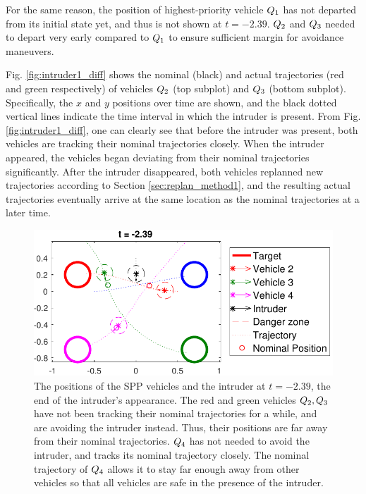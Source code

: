 For the same reason, the position of highest-priority vehicle $Q_1$ has not departed from its initial state yet, and thus is not shown at $t=-2.39$. $Q_2$ and $Q_3$ needed to depart very early compared to $Q_1$ to ensure sufficient margin for avoidance maneuvers.

Fig. \ref{fig:intruder1_diff} shows the nominal (black) and actual trajectories (red and green respectively) of vehicles $Q_2$ (top subplot) and $Q_3$ (bottom subplot). Specifically, the $x$ and $y$ positions over time are shown, and the black dotted vertical lines indicate the time interval in which the intruder is present. From Fig. \ref{fig:intruder1_diff}, one can clearly see that before the intruder was present, both vehicles are tracking their nominal trajectories closely. When the intruder appeared, the vehicles began deviating from their nominal trajectories significantly. After the intruder disappeared, both vehicles replanned new trajectories according to Section \ref{sec:replan_method1}, and the resulting actual trajectories eventually arrive at the same location as the nominal trajectories at a later time.

\begin{figure}[H]
  \centering
  \includegraphics[width=\columnwidth]{"fig/intruder1_traj"}
  \caption{The positions of the SPP vehicles and the intruder at $t=-2.39$, the end of the intruder's appearance. The red and green vehicles $Q_2, Q_3$ have not been tracking their nominal trajectories for a while, and are avoiding the intruder instead. Thus, their positions are far away from their nominal trajectories. $Q_4$ has not needed to avoid the intruder, and tracks its nominal trajectory closely. The nominal trajectory of $Q_4$ allows it to stay far enough away from other vehicles so that all vehicles are safe in the presence of the intruder.}
  \label{fig:intruder1_traj}
\end{figure}

